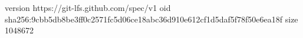 version https://git-lfs.github.com/spec/v1
oid sha256:9cbb5db8be3ff0c2571fc5d06ce18abc36d910e612cf1d5daf5f78f50e6ea18f
size 1048672
